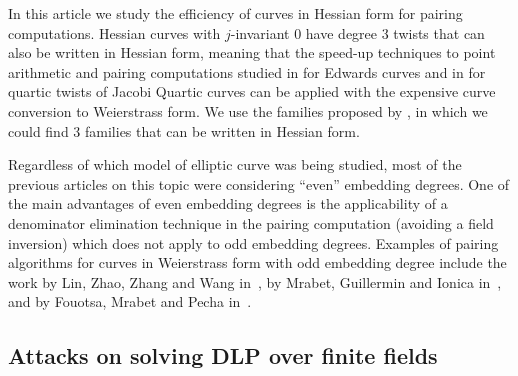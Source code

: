 In this article we study the efficiency of curves in Hessian form for pairing computations. 
Hessian curves with $j$-invariant 0 have degree 3 twists that can also be written in Hessian form, meaning that the speed-up techniques to point arithmetic and pairing computations studied in \cite{2012/LWZ} for Edwards curves and in
\cite{} for quartic twists of Jacobi Quartic curves can be applied
with the expensive curve conversion to Weierstrass form.
We use the families proposed by \cite{2010/FST}, in which we could find
3 families that can be written in Hessian form.

Regardless of which model of elliptic curve was being studied,
most of the previous articles on this topic were considering ``even'' embedding degrees.
One of the main advantages of even embedding degrees is the applicability of a denominator elimination technique in the pairing computation 
(avoiding a field inversion)
which does not apply to odd embedding degrees.
Examples of pairing algorithms for curves in Weierstrass form with odd embedding degree include
the work by Lin, Zhao, Zhang and Wang in~\cite{2008/lin}, by Mrabet, Guillermin and Ionica in~\cite{2009/deg15},
and by Fouotsa, Mrabet and Pecha in~\cite{2016/degodd}.

\subsection{Attacks on solving DLP over finite fields}


